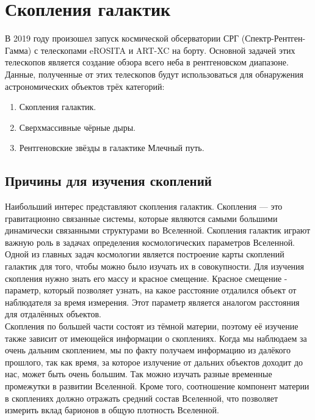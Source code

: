 \Introduction
\section{Скопления галактик}
В 2019 году произошел запуск космической обсерватории СРГ (Спектр-Рентген-Гамма) с телескопами 
eROSITA и ART-XC на борту. Основной задачей этих телескопов является создание обзора всего неба в 
рентгеновском диапазоне. Данные, полученные от этих телескопов будут использоваться для обнаружения 
астрономических объектов трёх категорий:

\begin{enumerate}
    \item Скопления галактик.
    \item Сверхмассивные чёрные дыры.
    \item Рентгеновские звёзды в галактике Млечный путь. 
\end{enumerate}

\subsection{Причины для изучения скоплений}

Наибольший интерес представляют скопления галактик. Скопления --- это гравитационно связанные 
системы, которые являются самыми большими динамически связанными структурами во Вселенной. 
Скопления галактик играют важную роль в задачах определения космологических параметров Вселенной.\\

Одной из главных задач космологии является построение карты скоплений галактик для того, чтобы 
можно было изучать их в совокупности. Для изучения скопления нужно знать его массу и красное 
смещение. Красное смещение - параметр, который позволяет узнать, на какое расстояние отдалился 
объект от наблюдателя за время измерения. Этот параметр является аналогом расстояния для отдалённых 
объектов. \\

Скопления по большей части состоят из тёмной материи, поэтому её изучение также зависит от 
имеющейся информации о скоплениях.
Когда мы наблюдаем за очень дальним скоплением, мы по факту получаем 
информацию из далёкого прошлого, так как время, за которое излучение от дальних объектов доходит до 
нас, может быть очень большим. Так можно изучать разные временные промежутки в развитии Вселенной.
Кроме того, соотношение компонент материи в 
скоплениях должно отражать средний состав Вселенной, что позволяет измерить вклад барионов в общую
плотность Вселенной.\\

